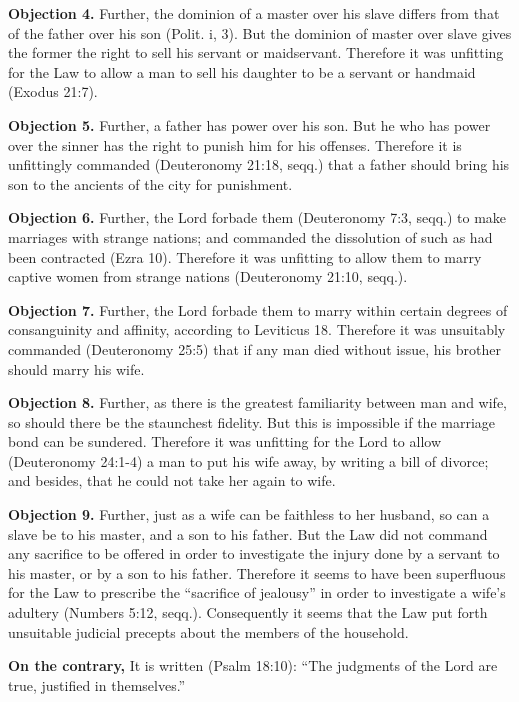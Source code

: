 \textbf{Objection 4.} Further, the dominion of a master over his slave differs from that of the father over his son (Polit. i, 3). But the dominion of master over slave gives the former the right to sell his servant or maidservant. Therefore it was unfitting for the Law to allow a man to sell his daughter to be a servant or handmaid (Exodus 21:7).

\textbf{Objection 5.} Further, a father has power over his son. But he who has power over the sinner has the right to punish him for his offenses. Therefore it is unfittingly commanded (Deuteronomy 21:18, seqq.) that a father should bring his son to the ancients of the city for punishment.

\textbf{Objection 6.} Further, the Lord forbade them (Deuteronomy 7:3, seqq.) to make marriages with strange nations; and commanded the dissolution of such as had been contracted (Ezra 10). Therefore it was unfitting to allow them to marry captive women from strange nations (Deuteronomy 21:10, seqq.).

\textbf{Objection 7.} Further, the Lord forbade them to marry within certain degrees of consanguinity and affinity, according to Leviticus 18. Therefore it was unsuitably commanded (Deuteronomy 25:5) that if any man died without issue, his brother should marry his wife.

\textbf{Objection 8.} Further, as there is the greatest familiarity between man and wife, so should there be the staunchest fidelity. But this is impossible if the marriage bond can be sundered. Therefore it was unfitting for the Lord to allow (Deuteronomy 24:1-4) a man to put his wife away, by writing a bill of divorce; and besides, that he could not take her again to wife.

\textbf{Objection 9.} Further, just as a wife can be faithless to her husband, so can a slave be to his master, and a son to his father. But the Law did not command any sacrifice to be offered in order to investigate the injury done by a servant to his master, or by a son to his father. Therefore it seems to have been superfluous for the Law to prescribe the ``sacrifice of jealousy'' in order to investigate a wife's adultery (Numbers 5:12, seqq.). Consequently it seems that the Law put forth unsuitable judicial precepts about the members of the household.

\textbf{On the contrary,} It is written (Psalm 18:10): ``The judgments of the Lord are true, justified in themselves.''

